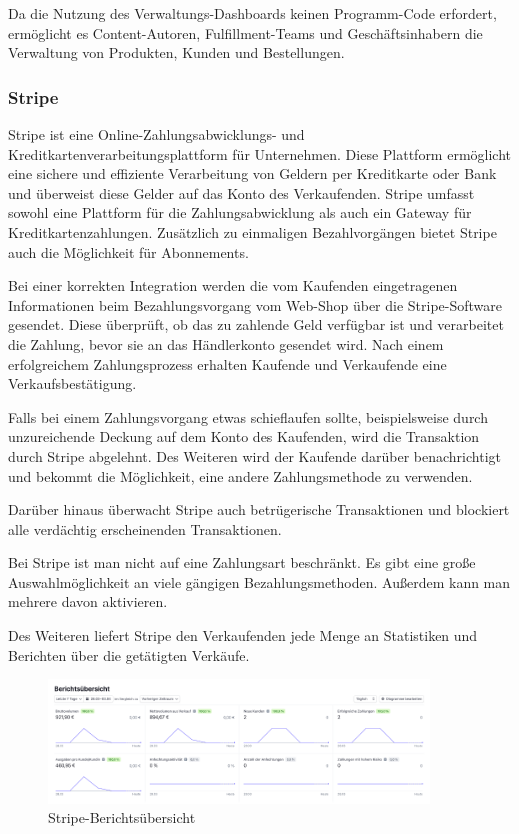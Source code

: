 Da die Nutzung des Verwaltungs-Dashboards keinen Programm-Code erfordert, ermöglicht es Content-Autoren, Fulfillment-Teams und Geschäftsinhabern die Verwaltung von Produkten, Kunden und Bestellungen.
\cite{commerceJS}

\newpage

\subsubsection{Stripe}

Stripe ist eine Online-Zahlungsabwicklungs- und Kreditkartenverarbeitungsplattform für Unternehmen. Diese Plattform ermöglicht eine sichere und effiziente Verarbeitung von Geldern per Kreditkarte oder Bank und überweist diese Gelder auf das Konto des Verkaufenden. Stripe umfasst sowohl eine Plattform für die Zahlungsabwicklung als auch ein Gateway für Kreditkartenzahlungen. Zusätzlich zu einmaligen Bezahlvorgängen bietet Stripe auch die Möglichkeit für Abonnements.

Bei einer korrekten Integration werden die vom Kaufenden eingetragenen Informationen beim Bezahlungsvorgang vom Web-Shop über die Stripe-Software gesendet. Diese überprüft, ob das zu zahlende Geld verfügbar ist und verarbeitet die Zahlung, bevor sie an das Händlerkonto gesendet wird. Nach einem erfolgreichem Zahlungsprozess erhalten Kaufende und Verkaufende eine Verkaufsbestätigung.

Falls bei einem Zahlungsvorgang etwas schieflaufen sollte, beispielsweise durch unzureichende Deckung auf dem Konto des Kaufenden, wird die Transaktion durch Stripe abgelehnt. Des Weiteren wird der Kaufende darüber benachrichtigt und bekommt die Möglichkeit, eine andere Zahlungsmethode zu verwenden.

Darüber hinaus überwacht Stripe auch betrügerische Transaktionen und blockiert alle verdächtig erscheinenden Transaktionen.

Bei Stripe ist man nicht auf eine Zahlungsart beschränkt. Es gibt eine große Auswahlmöglichkeit an viele gängigen Bezahlungsmethoden. Außerdem kann man mehrere davon aktivieren.

Des Weiteren liefert Stripe den Verkaufenden jede Menge an Statistiken und Berichten über die getätigten Verkäufe.

\cite{stripe}

\begin{figure}[H]
  \centering
  \includegraphics[width=0.9\textwidth]{pics/StripeBericht.png}
  \caption{Stripe-Berichtsübersicht}
\end{figure}